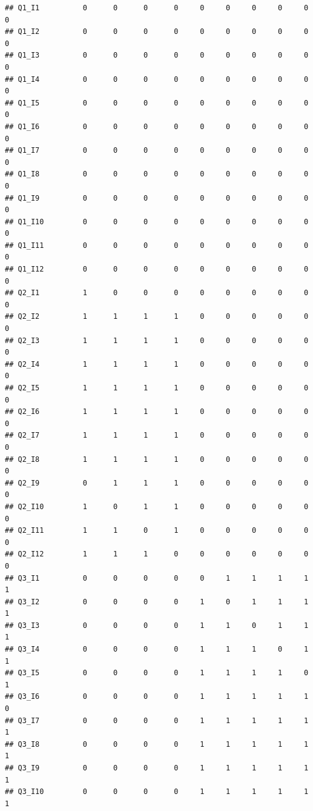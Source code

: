 \documentclass[]{book}
\begin{document}
\begin{verbatim}
## Q1_I1          0      0      0      0     0     0     0     0     0     0
## Q1_I2          0      0      0      0     0     0     0     0     0     0
## Q1_I3          0      0      0      0     0     0     0     0     0     0
## Q1_I4          0      0      0      0     0     0     0     0     0     0
## Q1_I5          0      0      0      0     0     0     0     0     0     0
## Q1_I6          0      0      0      0     0     0     0     0     0     0
## Q1_I7          0      0      0      0     0     0     0     0     0     0
## Q1_I8          0      0      0      0     0     0     0     0     0     0
## Q1_I9          0      0      0      0     0     0     0     0     0     0
## Q1_I10         0      0      0      0     0     0     0     0     0     0
## Q1_I11         0      0      0      0     0     0     0     0     0     0
## Q1_I12         0      0      0      0     0     0     0     0     0     0
## Q2_I1          1      0      0      0     0     0     0     0     0     0
## Q2_I2          1      1      1      1     0     0     0     0     0     0
## Q2_I3          1      1      1      1     0     0     0     0     0     0
## Q2_I4          1      1      1      1     0     0     0     0     0     0
## Q2_I5          1      1      1      1     0     0     0     0     0     0
## Q2_I6          1      1      1      1     0     0     0     0     0     0
## Q2_I7          1      1      1      1     0     0     0     0     0     0
## Q2_I8          1      1      1      1     0     0     0     0     0     0
## Q2_I9          0      1      1      1     0     0     0     0     0     0
## Q2_I10         1      0      1      1     0     0     0     0     0     0
## Q2_I11         1      1      0      1     0     0     0     0     0     0
## Q2_I12         1      1      1      0     0     0     0     0     0     0
## Q3_I1          0      0      0      0     0     1     1     1     1     1
## Q3_I2          0      0      0      0     1     0     1     1     1     1
## Q3_I3          0      0      0      0     1     1     0     1     1     1
## Q3_I4          0      0      0      0     1     1     1     0     1     1
## Q3_I5          0      0      0      0     1     1     1     1     0     1
## Q3_I6          0      0      0      0     1     1     1     1     1     0
## Q3_I7          0      0      0      0     1     1     1     1     1     1
## Q3_I8          0      0      0      0     1     1     1     1     1     1
## Q3_I9          0      0      0      0     1     1     1     1     1     1
## Q3_I10         0      0      0      0     1     1     1     1     1     1

\end{verbatim}
\end{document}
